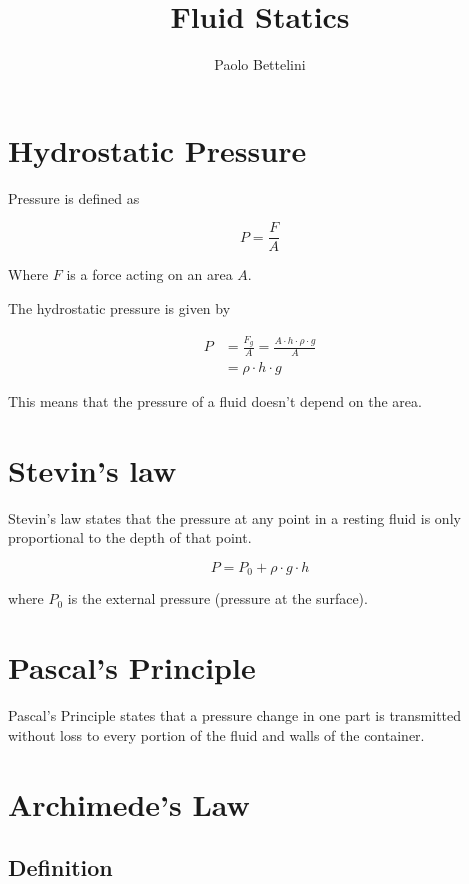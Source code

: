 \documentclass{article}
\title{Fluid Statics}
\author{Paolo Bettelini}
\date{}
\begin{document}
\maketitle
\tableofcontents
\pagebreak

\section{Hydrostatic Pressure}

Pressure is defined as 

\[
    P = \frac{F}{A}
\]

Where \(F\) is a force acting on an area \(A\).

The hydrostatic pressure is given by

\begin{align*}
    P &= \frac{F_g}{A} = \frac{A \cdot h \cdot \rho \cdot g}{A} \\
    &= \rho \cdot h \cdot g
\end{align*}

This means that the pressure of a fluid doesn't depend
on the area.

\section{Stevin's law}

Stevin's law states that the pressure at any point
in a resting fluid is only proportional to the depth of that point.

\[
    P = P_0 + \rho \cdot g \cdot h
\]

where \(P_0\) is the external pressure (pressure at the surface).

\section{Pascal's Principle}

Pascal's Principle states that a pressure change in one part
is transmitted without loss to every portion of the fluid and walls of the container.

\section{Archimede's Law}

\subsection{Definition}
\end{document}
